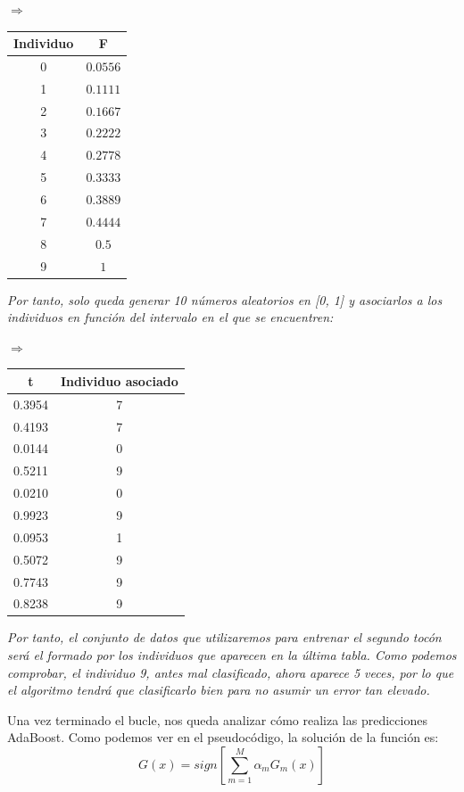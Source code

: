 \documentclass[12pt,twoside]{article}
\begin{document}
\begin{center}
$\Rightarrow$
\begin{tabular}{|c|c|}
\hline
Individuo & F \\ \hline
0 & $0.0556$ \\ \hline
1 & $0.1111$ \\ \hline
2 & $0.1667$ \\ \hline
3 & $0.2222$ \\ \hline
4 & $0.2778$ \\ \hline
5 & $0.3333$ \\ \hline
6 & $0.3889$ \\ \hline
7 & $0.4444$ \\ \hline
8 & $0.5$ \\ \hline
9 & $1$ \\ \hline
\end{tabular}
\end{center}
\textit{Por tanto, solo queda generar 10 números aleatorios en [0, 1] y asociarlos a los individuos en función del intervalo en el que se encuentren: }
\begin{center}
$\Rightarrow$
\begin{tabular}{|c|c|}
\hline
t & Individuo asociado \\ \hline
0.3954 & 7 \\ \hline
0.4193 & 7 \\ \hline
0.0144 & 0 \\ \hline
0.5211 & 9 \\ \hline
0.0210 & 0 \\ \hline
0.9923 & 9 \\ \hline
0.0953 & 1 \\ \hline
0.5072 & 9 \\ \hline
0.7743 & 9 \\ \hline
0.8238 & 9 \\ \hline
\end{tabular}
\end{center}
\textit{Por tanto, el conjunto de datos que utilizaremos para entrenar el segundo tocón será el formado por los individuos que aparecen en la última tabla. Como podemos comprobar, el individuo 9, antes mal clasificado, ahora aparece 5 veces, por lo que el algoritmo tendrá que clasificarlo bien para no asumir un error tan elevado.}

\bigskip \bigskip \bigskip \bigskip \bigskip

Una vez terminado el bucle, nos queda analizar cómo realiza las predicciones AdaBoost. Como podemos ver en el pseudocódigo, la solución de la función es:
\begin{equation*}
G(x) = sign \left[ \sum_{m=1}^M \alpha_m G_m(x) \right]
\end{equation*}
\end{document}
